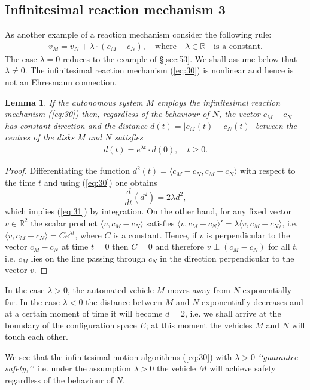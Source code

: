 \documentclass[11pt]{amsart}
\newtheorem{lemma}[theorem]{Lemma}
\def\R{\mathbb R}
\begin{document}
{\subsection{Infinitesimal reaction mechanism 3} \label{sec:54}
As another example of a reaction mechanism consider the following rule:
\begin{eqnarray}\label{eq:30}
v_M=v_N+\lambda\cdot (c_M-c_N), \quad \mbox{where}\quad \lambda\in \R\quad \mbox{is a constant}.
\end{eqnarray}
The case $\lambda=0$ reduces to the example of \S \ref{sec:53}. We shall assume below that $\lambda\not=0$. 
The infinitesimal reaction mechanism (\ref{eq:30}) is nonlinear and hence is not an Ehresmann connection.
\begin{lemma}
If the autonomous system $M$ employs the infinitesimal reaction mechanism (\ref{eq:30}) then, regardless of the behaviour of $N$,
the vector $c_M-c_N$ has constant direction and 
the distance $d(t)=|c_M(t)-c_N(t)|$ between the centres of the disks $M$ and $N$ satisfies 
\begin{eqnarray}\label{eq:31}
d(t)=e^{\lambda t}\cdot d(0), \quad t\ge 0.
\end{eqnarray}
\end{lemma}
\begin{proof} Differentiating the function $d^2(t)=\langle c_M-c_N, c_M-c_N\rangle$ with respect to the time $t$ and using (\ref{eq:30}) one obtains 
$$
\frac{d}{dt}(d^2)=2 \lambda d^2,
$$
which implies (\ref{eq:31}) by integration. On the other hand, for any fixed vector $v\in \R^2$ the scalar product $\langle v, c_M-c_N\rangle$ satisfies 
$\langle v, c_M-c_N\rangle'=\lambda \langle v, c_M-c_N\rangle$, i.e. $\langle v, c_M-c_N\rangle=Ce^{\lambda t}$, where $C$ is a constant. Hence, if $v$ is perpendicular to the vector 
$c_M-c_N$ at time $t=0$ then $C=0$ and therefore $v\perp (c_M-c_N)$ for all $t$, i.e. $c_M$ lies on the line passing through $c_N$ in the direction perpendicular to the vector $v$. 
\end{proof}


In the case $\lambda>0$, the automated vehicle $M$ moves away from $N$ exponentially far. In the case $\lambda<0$ the distance between $M$ and $N$ exponentially decreases and at a certain moment of time it will become $d=2$, i.e. we shall arrive at the boundary of the configuration space $E$; at this moment the vehicles $M$ and $N$ will touch each other. 

We see that the infinitesimal motion algorithms (\ref{eq:30}) 
with $\lambda>0$ {\it \lq\lq guarantee safety,\rq\rq}\  i.e. under the assumption $\lambda>0$
the vehicle $M$ will achieve safety regardless of the behaviour of $N$. 

}
\end{document}
